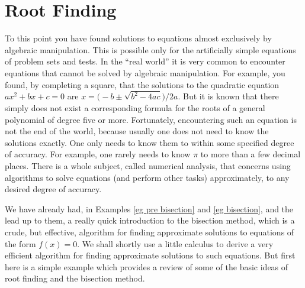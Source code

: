 %
%
\graphicspath{{figures/rootFinding/}}

\chapter{Root Finding}\label{app root finding}

To this point you have found solutions to equations almost
exclusively by algebraic manipulation. This is possible only
for the artificially simple equations of problem sets and
tests. In the ``real world'' it is very common to encounter
equations that cannot be solved by algebraic manipulation.
For example, you found, by completing a square, that the 
solutions to the quadratic equation $ax^2+bx+c=0$ are 
$x=\big(-b\pm\sqrt{b^2-4ac}\big)/2a$.
But it is known that there simply does not exist a corresponding formula
for the roots of a general polynomial of degree five or more.
Fortunately, encountering such an equation is not the end of the
world, because usually one does not need to know the solutions
exactly. One only needs to know them to within some specified 
degree of accuracy. For example, one rarely needs to know $\pi$ 
to more than a few decimal places. There is a whole subject, 
called numerical analysis, that concerns using algorithms to solve 
equations (and perform other tasks) approximately, to any desired 
degree of accuracy. 

We have already had, in Examples \ref{eg pre bisection} and \ref{eg bisection},
and the lead up to them, a really quick introduction to the bisection method, 
which is a crude, but effective, algorithm for finding approximate solutions to equations 
of the form $f(x)=0$. We shall shortly use a little calculus
to derive a very efficient algorithm for finding approximate solutions
to such equations. But first here is a simple
example which provides a review of some of the basic ideas of root
finding and the bisection method.

